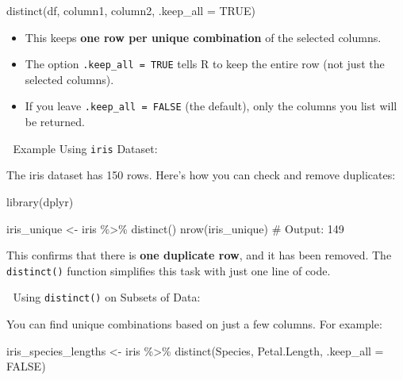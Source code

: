 \documentclass[
  man,
  floatsintext,
  longtable,
  nolmodern,
  notxfonts,
  notimes,
  colorlinks=true,linkcolor=blue,citecolor=blue,urlcolor=blue]{apa7}
\newenvironment{Shaded}{\begin{snugshade}}{\end{snugshade}}
\newcommand{\AttributeTok}[1]{\textcolor[rgb]{0.40,0.45,0.13}{#1}}
\newcommand{\CommentTok}[1]{\textcolor[rgb]{0.37,0.37,0.37}{#1}}
\newcommand{\ConstantTok}[1]{\textcolor[rgb]{0.56,0.35,0.01}{#1}}
\newcommand{\FunctionTok}[1]{\textcolor[rgb]{0.28,0.35,0.67}{#1}}
\newcommand{\NormalTok}[1]{\textcolor[rgb]{0.00,0.23,0.31}{#1}}
\newcommand{\OtherTok}[1]{\textcolor[rgb]{0.00,0.23,0.31}{#1}}
\newcommand{\SpecialCharTok}[1]{\textcolor[rgb]{0.37,0.37,0.37}{#1}}
\providecommand{\tightlist}{%
  \setlength{\itemsep}{0pt}\setlength{\parskip}{0pt}}
\begin{document}
\begin{Shaded}
\begin{Highlighting}[]
\FunctionTok{distinct}\NormalTok{(df, column1, column2, }\AttributeTok{.keep\_all =} \ConstantTok{TRUE}\NormalTok{)}
\end{Highlighting}
\end{Shaded}

\begin{itemize}
\tightlist
\item
  This keeps \textbf{one row per unique combination} of the selected
  columns.
\item
  The option \texttt{.keep\_all\ =\ TRUE} tells R to keep the entire row
  (not just the selected columns).
\item
  If you leave \texttt{.keep\_all\ =\ FALSE} (the default), only the
  columns you list will be returned.
\end{itemize}

🔹 Example Using \texttt{iris} Dataset:

The iris dataset has 150 rows. Here's how you can check and remove
duplicates:

\begin{Shaded}
\begin{Highlighting}[]
\FunctionTok{library}\NormalTok{(dplyr)}

\NormalTok{iris\_unique }\OtherTok{\textless{}{-}}\NormalTok{ iris }\SpecialCharTok{\%\textgreater{}\%} \FunctionTok{distinct}\NormalTok{()}
\FunctionTok{nrow}\NormalTok{(iris\_unique)}
\CommentTok{\# Output: 149}
\end{Highlighting}
\end{Shaded}

This confirms that there is \textbf{one duplicate row}, and it has been
removed. The \texttt{distinct()} function simplifies this task with just
one line of code.

🔹 Using \texttt{distinct()} on Subsets of Data:

You can find unique combinations based on just a few columns. For
example:

\begin{Shaded}
\begin{Highlighting}[]
\NormalTok{iris\_species\_lengths }\OtherTok{\textless{}{-}}\NormalTok{ iris }\SpecialCharTok{\%\textgreater{}\%}
  \FunctionTok{distinct}\NormalTok{(Species, Petal.Length, }\AttributeTok{.keep\_all =} \ConstantTok{FALSE}\NormalTok{)}
\end{Highlighting}
\end{Shaded}
\end{document}
